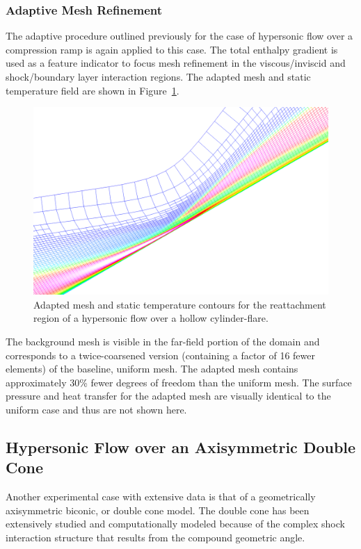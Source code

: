 \subsubsection{Adaptive Mesh Refinement}
The adaptive procedure outlined previously for the case of hypersonic flow over a compression ramp is again applied to this case.  The total enthalpy gradient is used as a feature indicator to focus mesh refinement in the viscous/inviscid and shock/boundary layer interaction regions.  The adapted mesh and static temperature field are shown in Figure~\ref{fig:hollow_cylinder_amr}.
\begin{figure}[hbtp]
  \begin{center}
    \includegraphics[width=\textwidth]{figures/holden_hollow_cylinder/amr2}
    \caption{Adapted mesh and static temperature contours for the reattachment region of a  hypersonic flow over a hollow cylinder-flare.\label{fig:hollow_cylinder_amr}}
  \end{center}
\end{figure}
The background mesh is visible in the far-field portion of the domain and corresponds to a twice-coarsened version (containing a factor of 16 fewer elements) of the baseline, uniform mesh. The adapted mesh contains approximately 30\% fewer degrees of freedom than the uniform mesh.
The surface pressure and heat transfer for the adapted mesh are visually identical to the uniform case and thus are not shown here.  



\clearpage
\subsection{Hypersonic Flow over an Axisymmetric Double Cone\label{sec:comp_ns_double_cone}}
Another experimental case with extensive data is that of a
geometrically axisymmetric biconic, or double cone model. The double
cone has been extensively studied and computationally modeled because
of the complex shock interaction structure that results from the
compound geometric angle.

